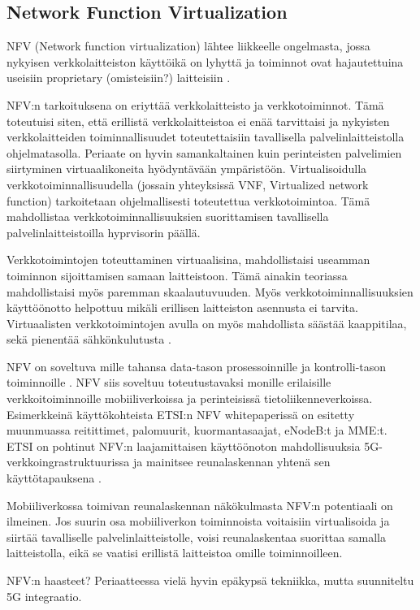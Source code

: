 \subsection{Network Function Virtualization}
NFV (Network function virtualization) lähtee liikkeelle ongelmasta, jossa nykyisen verkkolaitteiston käyttöikä on lyhyttä ja toiminnot ovat hajautettuina useisiin proprietary (omisteisiin?) laitteisiin \cite{nfvwhite}. 

NFV:n tarkoituksena on eriyttää verkkolaitteisto ja verkkotoiminnot. Tämä toteutuisi siten, että erillistä verkkolaitteistoa ei enää tarvittaisi ja nykyisten verkkolaitteiden toiminnallisuudet toteutettaisiin tavallisella palvelinlaitteistolla ohjelmatasolla. Periaate on hyvin samankaltainen kuin perinteisten palvelimien siirtyminen virtuaalikoneita hyödyntävään ympäristöön.
Virtualisoidulla verkkotoiminnallisuudella (jossain yhteyksissä VNF, Virtualized network function) tarkoitetaan ohjelmallisesti toteutettua verkkotoimintoa. Tämä mahdollistaa verkkotoiminnallisuuksien suorittamisen tavallisella palvelinlaitteistoilla hyprvisorin päällä. 

 Verkkotoimintojen toteuttaminen virtuaalisina, mahdollistaisi useamman toiminnon sijoittamisen samaan laitteistoon. Tämä ainakin teoriassa mahdollistaisi myös paremman skaalautuvuuden. Myös verkkotoiminnallisuuksien käyttöönotto helpottuu mikäli erillisen laitteiston asennusta ei tarvita. Virtuaalisten verkkotoimintojen avulla on myös mahdollista säästää kaappitilaa, sekä pienentää sähkönkulutusta \cite{nfvedge}.

NFV on soveltuva mille tahansa data-tason prosessoinnille ja kontrolli-tason toiminnoille \cite{nfvwhite}. NFV siis soveltuu toteutustavaksi monille erilaisille verkkoitoiminnoille mobiiliverkoissa ja perinteisissä tietoliikenneverkoissa. Esimerkkeinä käyttökohteista ETSI:n NFV whitepaperissä on esitetty muunmuassa reitittimet, palomuurit, kuormantasaajat, eNodeB:t ja MME:t. ETSI on pohtinut NFV:n laajamittaisen käyttöönoton mahdollisuuksia 5G-verkkoingrastruktuurissa ja mainitsee reunalaskennan yhtenä sen käyttötapauksena \cite{etsinfv5g}.

Mobiiliverkossa toimivan reunalaskennan näkökulmasta NFV:n potentiaali on ilmeinen. Jos suurin osa mobiiliverkon toiminnoista voitaisiin virtualisoida ja siirtää tavalliselle palvelinlaitteistolle, voisi reunalaskentaa suorittaa samalla laitteistolla, eikä se vaatisi erillistä laitteistoa omille toiminnoilleen.

NFV:n haasteet? Periaatteessa vielä hyvin epäkypsä tekniikka, mutta suunniteltu 5G integraatio.
